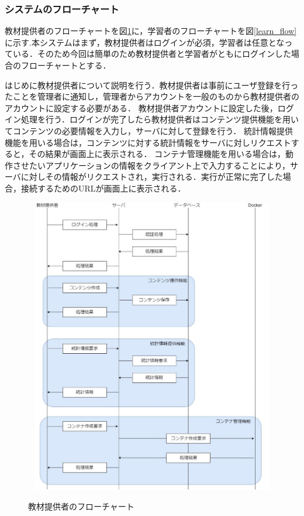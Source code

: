 \newpage
\subsubsection{システムのフローチャート}
教材提供者のフローチャートを図\ref{provider_flow}に，学習者のフローチャートを図\ref{learn_flow}に示す.本システムはまず，教材提供者はログインが必須，学習者は任意となっている．そのため今回は簡単のため教材提供者と学習者がともにログインした場合のフローチャートとする．

はじめに教材提供者について説明を行う．教材提供者は事前にユーザ登録を行ったことを管理者に通知し，管理者からアカウントを一般のものから教材提供者のアカウントに設定する必要がある．
教材提供者アカウントに設定した後，ログイン処理を行う．ログインが完了したら教材提供者はコンテンツ提供機能を用いてコンテンツの必要情報を入力し，サーバに対して登録を行う．
統計情報提供機能を用いる場合は，コンテンツに対する統計情報をサーバに対しリクエストすると，その結果が画面上に表示される．
コンテナ管理機能を用いる場合は，動作させたいアプリケーションの情報をクライアント上で入力することにより，サーバに対しその情報がリクエストされ，実行される．実行が正常に完了した場合，接続するためのURLが画面上に表示される．

\begin{figure}[htbp]
    \begin{center}
        \includegraphics[width=14cm,height=13cm,keepaspectratio]{provider_flow-crop.pdf}\\
    \end{center}
    \caption{教材提供者のフローチャート}
    \label{provider_flow}
\end{figure}

